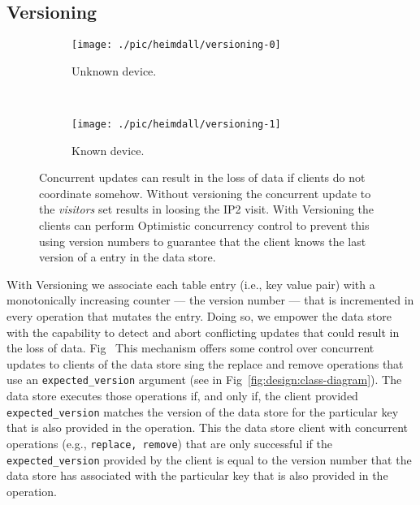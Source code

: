 \documentclass[12pt,openright,twoside]{report}
\begin{document}
\subsection {Versioning}
\begin{figure}[ht]
  \centering
  \begin{subfigure}[b]{0.5\textwidth}
                \centering
                \texttt{[image: ./pic/heimdall/versioning-0]}
                \caption{Unknown device.}
                \label{fig:dm:comparison:unknown}

        \end{subfigure}%
        ~
        \begin{subfigure}[b]{0.5\textwidth}
                \centering
                \texttt{[image: ./pic/heimdall/versioning-1]}
                \caption{Known device.}
                \label{fig:dm:comparison:known}
        \end{subfigure}
  \caption[Concurrent updates]{Concurrent updates can result in the loss of data if clients do not coordinate somehow. Without versioning the concurrent update to the \emph{visitors} set results in loosing the IP2 visit.  With Versioning  the clients can perform Optimistic concurrency control to prevent this using version numbers to guarantee that the client knows the last version of a entry in the data store.}
\end{figure}
With Versioning we associate each table entry (i.e., key value pair)  with a monotonically increasing counter --- the version number ---   that is incremented in every operation that mutates the entry. 
Doing so, we empower the data store with the capability to detect and abort conflicting updates that could result in the loss of data. 
Fig~
This mechanism offers some control over concurrent updates to clients of the data store sing the replace and remove operations that use an \texttt{expected\_version} argument (see in Fig~\ref{fig:design:class-diagram}). The data store executes those operations if, and only if, the client provided \texttt{expected\_version} matches the version of the data store for the particular key that is also provided in the operation.  
This the data store client with concurrent operations (e.g., \texttt{replace, remove}) that are only successful if the \texttt{expected\_version} provided by the client is equal to the version number that the data store has associated with the particular key that is also provided in the operation. 
\end{document}
